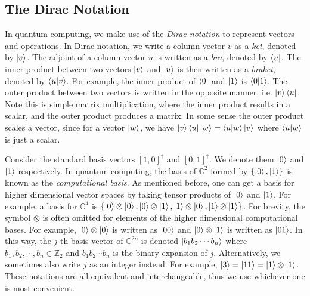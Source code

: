 \documentclass[12pt]{dalthesis}
\begin{document}
\subsection{The Dirac Notation}
In quantum computing, we make use of the \emph{Dirac notation} to represent vectors and operations. In Dirac notation, we write a column vector $v$ as a \emph{ket}, denoted by $\ket{v}$. The adjoint of a column vector $u$ is written as a \emph{bra}, denoted by $\bra{u}$. The inner product between two vectors $\ket{v}$ and $\ket{u}$ is then written as a \emph{braket}, denoted by $\braket{u|v}$. For example, the inner product of $\bra{0}$ and $\ket{1}$ is $\braket{0|1}$. The outer product between two vectors is written in the opposite manner, i.e. $\ket{v} \bra{u}$. Note this is simple matrix multiplication, where the inner product results in a scalar, and the outer product produces a matrix. In some sense the outer product scales a vector, since for a vector $\ket{w}$, we have $\ket{v}\bra{u} \ket{w} = \braket{u|w}\ket{v}$ where $\braket{u|w}$ is just a scalar.

Consider the standard basis vectors $[1, 0]^{\dag}$ and $[0, 1]^{\dag}$. We denote them $\ket{0}$ and $\ket{1}$ respectively. In quantum computing, the basis of $\mathbb{C}^2$ formed by $\{ \ket{0} , \ket{1} \}$ is known as the \emph{computational basis}. As mentioned before, one can get a basis for higher dimensional vector spaces by taking tensor products of $\ket{0}$ and $\ket{1}$. For example, a basis for $\mathbb{C}^4$ is $\{ \ket{0} \otimes \ket{0}, \ket{0} \otimes \ket{1}, \ket{1} \otimes \ket{0}, \ket{1} \otimes \ket{1} \}$. For brevity, the symbol $\otimes$ is often omitted for elements of the higher dimensional computational bases. For example, $\ket{0} \otimes \ket{0}$ is written as $\ket{00}$ and $\ket{0} \otimes \ket{1}$ is written as $\ket{01}$. In this way, the $j$-th basis vector of $\mathbb{C}^{2n}$ is denoted $\ket{b_1 b_2 \cdots b_n}$ where $b_1, b_2, \cdots , b_n \in \mathbb{Z}_2$ and $b_1 b_2 \cdots b_n$ is the binary expansion of $j$. Alternatively, we sometimes also write $j$ as an integer instead. For example, $\ket{3} = \ket{11} = \ket{1} \otimes \ket{1}$. These notations are all equivalent and interchangeable, thus we use whichever one is most convenient.
\end{document}
